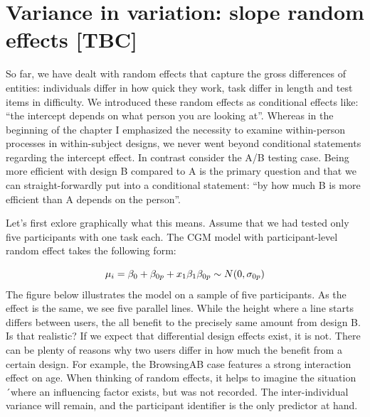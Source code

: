 \documentclass[]{svmono}
\theoremstyle{definition}
\theoremstyle{definition}
\theoremstyle{definition}
\theoremstyle{remark}
\begin{document}
\section{Variance in variation: slope random effects
{[}TBC{]}}\label{slope_RE}

So far, we have dealt with random effects that capture the gross
differences of entities: individuals differ in how quick they work, task
differ in length and test items in difficulty. We introduced these
random effects as conditional effects like: ``the intercept depends on
what person you are looking at''. Whereas in the beginning of the
chapter I emphasized the necessity to examine within-person processes in
within-subject designs, we never went beyond conditional statements
regarding the intercept effect. In contrast consider the A/B testing
case. Being more efficient with design B compared to A is the primary
question and that we can straight-forwardly put into a conditional
statement: ``by how much B is more efficient than A depends on the
person''.

Let's first exlore graphically what this means. Assume that we had
tested only five participants with one task each. The CGM model with
participant-level random effect takes the following form:

\[
\mu_i = \beta_0 + \beta_{0p} + x_1\beta_1\\
\beta_{0p} \sim N(0,\sigma_{0p})
\] The figure below illustrates the model on a sample of five
participants. As the effect is the same, we see five parallel lines.
While the height where a line starts differs between users, the all
benefit to the precisely same amount from design B. Is that realistic?
If we expect that differential design effects exist, it is not. There
can be plenty of reasons why two users differ in how much the benefit
from a certain design. For example, the BrowsingAB case features a
strong interaction effect on age. When thinking of random effects, it
helps to imagine the situation´where an influencing factor exists, but
was not recorded. The inter-individual variance will remain, and the
participant identifier is the only predictor at hand.
\end{document}
